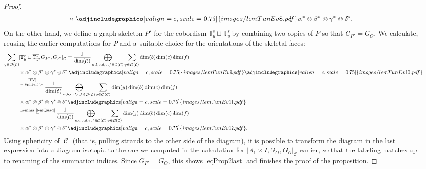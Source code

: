 \documentclass[10pt,a4paper]{amsart}
\DeclareMathOperator{\calc}{\mathcal{C}}
\DeclareMathOperator{\calo}{\mathcal{O}}
\numberwithin{equation}{section}
\theoremstyle{definition}
\begin{document}
\begin{proof}
\begin{align*}
 & \times \adjincludegraphics[valign=c, scale = 0.75]{images/lemTunEv8.pdf} \alpha^* \otimes \beta^* \otimes \gamma^* \otimes \delta^*.
 \end{align*}
On the other hand, we define a graph skeleton $P'$ for the cobordism $\mathbb{T}_y^s \sqcup \overline{\mathbb{T}_y^s}$ by combining two copies of $P$ so that $G_{P'} = G_O$. We calculate, reusing the earlier computations for $P$ and a~suitable choice for the orientations of the skeletal faces:
 \begin{align*}
 \sum_{y \in \calo(\calc)} &|\mathbb{T}_y^s \sqcup \overline{\mathbb{T}_y^s}, G_{P'}, G_{P'}|_{\calc} = \frac{1}{\dim(\calc)} \bigoplus_{a, b, c, d, e, f \in \calo(\calc)} \sum_{y \in \calo(\calc)} \dim(b) \dim(c) \dim(f) \\
 &\times \alpha^* \otimes \beta^* \otimes \gamma^* \otimes \delta^* \,\adjincludegraphics[valign=c, scale = 0.75]{images/lemTunEv9.pdf} \adjincludegraphics[valign=c, scale = 0.75]{images/lemTunEv10.pdf}\\
 &\overset{\substack{\text{\cite[Lemma 12.3]{TV}} \\ \text{+ sphericity}}}{=} \frac{1}{\dim(\calc)} \bigoplus_{a, b, c, d, e, f \in \calo(\calc)} \sum_{y \in \calo(\calc)} \dim(y)\dim(b) \dim(c) \dim(f) \cdot \\
 &\times \alpha^* \otimes \beta^* \otimes \gamma^* \otimes \delta^* \adjincludegraphics[valign=c, scale = 0.75]{images/lemTunEv11.pdf} \\
 &\overset{\text{Lemma~\ref{lemQuad}}}{=} \frac{1}{\dim(\calc)} \bigoplus_{a, b, c, d, e, f \in \calo(\calc)} \sum_{y \in \calo(\calc)} \dim(y)\dim(b) \dim(c) \dim(f) \\
 &\times \alpha^* \otimes \beta^* \otimes \gamma^* \otimes \delta^* \adjincludegraphics[valign=c, scale = 0.75]{images/lemTunEv12.pdf}.
 \end{align*}
Using sphericity of $\calc$ (that is, pulling strands to the other side of the diagram), it is possible to transform the diagram in the last expression into a diagram isotopic to the one we computed in the calculation for $|A_1 \times I, G_O, G_O|_{\calc}$ earlier, so that the labeling matches up to renaming of the summation indices. Since $G_{P'} = G_O$, this shows \eqref{eqProp2last} and finishes the proof of the proposition.
\end{proof}
\end{document}
